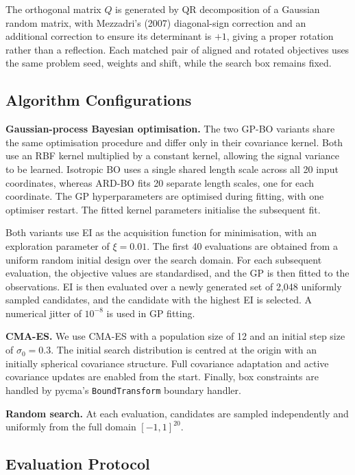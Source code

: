 \documentclass[11pt]{article}
\begin{document}
The orthogonal matrix $Q$ is generated by QR decomposition of a Gaussian random matrix, with Mezzadri's (2007) diagonal-sign correction and an additional correction to ensure its determinant is $+1$, giving a proper rotation rather than a reflection. Each matched pair of aligned and rotated objectives uses the same problem seed, weights and shift, while the search box remains fixed.

\subsection{Algorithm Configurations}

\textbf{Gaussian-process Bayesian optimisation.} The two GP-BO variants share the same optimisation procedure and differ only in their covariance kernel. Both use an RBF kernel multiplied by a constant kernel, allowing the signal variance to be learned. Isotropic BO uses a single shared length scale across all 20 input coordinates, whereas ARD-BO fits 20 separate length scales, one for each coordinate. The GP hyperparameters are optimised during fitting, with one optimiser restart. The fitted kernel parameters initialise the subsequent fit.

Both variants use EI as the acquisition function for minimisation, with an exploration parameter of $\xi = 0.01$. The first 40 evaluations are obtained from a uniform random initial design over the search domain. For each subsequent evaluation, the objective values are standardised, and the GP is then fitted to the observations. EI is then evaluated over a newly generated set of 2,048 uniformly sampled candidates, and the candidate with the highest EI is selected. A numerical jitter of $10^{-8}$ is used in GP fitting.

\textbf{CMA-ES.} We use CMA-ES with a population size of 12 and an initial step size of $\sigma_0 = 0.3$. The initial search distribution is centred at the origin with an initially spherical covariance structure. Full covariance adaptation and active covariance updates are enabled from the start. Finally, box constraints are handled by pycma's \texttt{BoundTransform} boundary handler.

\textbf{Random search.} At each evaluation, candidates are sampled independently and uniformly from the full domain $[-1, 1]^{20}$.

\subsection{Evaluation Protocol}
\end{document}
